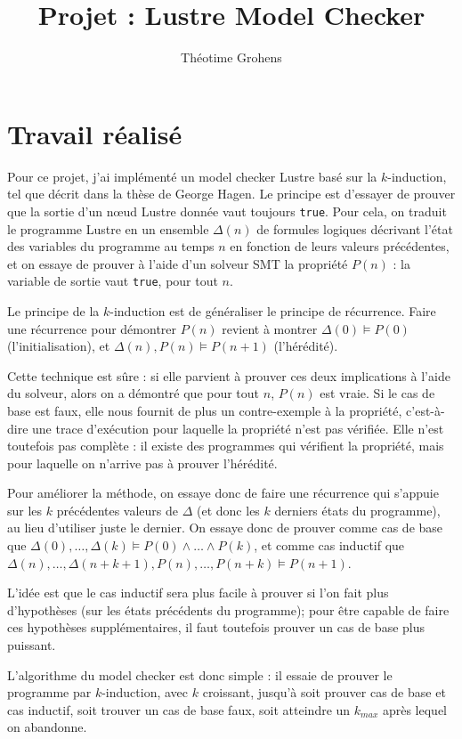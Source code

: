 \documentclass[a4paper]{article}
\author{Théotime Grohens}
\title{Projet : Lustre Model Checker}
\begin{document}
\maketitle

\section{Travail réalisé}

Pour ce projet, j'ai implémenté un model checker Lustre basé sur la $k$-induction, tel que décrit dans la thèse de George Hagen.
Le principe est d'essayer de prouver que la sortie d'un nœud Lustre donnée vaut toujours \texttt{true}.
Pour cela, on traduit le programme Lustre en un ensemble $\Delta(n)$ de formules logiques décrivant l'état des variables du programme au temps $n$ en fonction de leurs valeurs précédentes, et on essaye de prouver à l'aide d'un solveur SMT la propriété $P(n)$ : la variable de sortie vaut \texttt{true}, pour tout $n$.

Le principe de la $k$-induction est de généraliser le principe de récurrence.
Faire une récurrence pour démontrer $P(n)$ revient à montrer $\Delta(0)\models P(0)$ (l'initialisation), et $\Delta(n), P(n) \models P(n+1)$ (l'hérédité).

Cette technique est sûre : si elle parvient à prouver ces deux implications à l'aide du solveur, alors on a démontré que pour tout $n$, $P(n)$ est vraie.
Si le cas de base est faux, elle nous fournit de plus un contre-exemple à la propriété, c'est-à-dire une trace d'exécution pour laquelle la propriété n'est pas vérifiée.
Elle n'est toutefois pas complète : il existe des programmes qui vérifient la propriété, mais pour laquelle on n'arrive pas à prouver l'hérédité.

Pour améliorer la méthode, on essaye donc de faire une récurrence qui s'appuie sur les $k$ précédentes valeurs de $\Delta$ (et donc les $k$ derniers états du programme), au lieu d'utiliser juste le dernier.
On essaye donc de prouver comme cas de base que $\Delta(0), \ldots, \Delta(k) \models P(0) \wedge \ldots \wedge P(k)$, et comme cas inductif que $\Delta(n), \ldots, \Delta(n+k+1), P(n), \ldots, P(n+k) \models P(n+1)$. 

L'idée est que le cas inductif sera plus facile à prouver si l'on fait plus d'hypothèses (sur les états précédents du programme); pour être capable de faire ces hypothèses supplémentaires, il faut toutefois prouver un cas de base plus puissant. 

L'algorithme du model checker est donc simple : il essaie de prouver le programme par $k$-induction, avec $k$ croissant, jusqu'à soit prouver cas de base et cas inductif, soit trouver un cas de base faux, soit atteindre un $k_{max}$ après lequel on abandonne.
\end{document}
